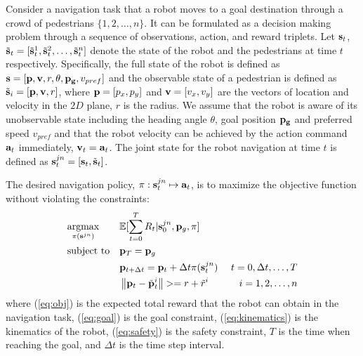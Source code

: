 \documentclass[letterpaper, 10 pt, conference]{ieeeconf}  %
\begin{document}
Consider a navigation task that a robot moves to a goal destination through a crowd of pedestrians $\{1,2,\dots,n\}$. It can be formulated as a decision making problem through a sequence of observations, action, and reward triplets\cite{chen_decentralized_2016,chen_socially_2017,everett_motion_2018}. Let $\bold{s}_t $, $\tilde{\bold{s}}_t = [\tilde{\bold{s}}_t^1, \tilde{\bold{s}}_t^2, \dots, \tilde{\bold{s}}_t^n]$ denote the state of the robot and the pedestrians at time $t$ respectively. Specifically, the full state of the robot is defined as $ \bold{s} = [\bold{p}, \bold{v}, r, \theta, \bold{p_g}, v_{pref}]$ and the observable state of a pedestrian is defined as $ \tilde{\bold{s}}_i = [\bold{p}, \bold{v}, r]$, where $\bold{p}=[p_x,p_y]$ and $\bold{v}=[v_x,v_y]$ are the vectors of location and velocity in the $2D$ plane, $r$ is the radius. We assume that the robot is aware of its unobservable state including the heading angle $\theta$, goal position $\bold{p_g}$ and preferred speed $v_{pref}$ and that the robot velocity can be achieved by the action command $\bold{a}_t$ immediately, $\bold{v}_t = \bold{a}_t$. The joint state for the robot navigation at time $t$ is defined as $\bold{s}_t^{jn} = [\bold{s}_t, \tilde{\bold{s}}_t]$. 

The desired navigation policy, $\pi : \bold{s}_t^{jn} \mapsto \bold{a}_t$, is to maximize the objective function without violating the constraints:
\begin{subequations} \label{eq:optimization}
\begin{align}
& \underset{\pi(\bold{s}^{jn})}{\text{argmax}}
& & \mathbb{E}[\sum_{t=0}^T R_t | \bold{s}_0^{jn}, \bold{p}_g, \pi] \label{eq:obj} \\
& \text{subject to} 
& & \bold{p}_T = \bold{p}_g \label{eq:goal} \\
&&& \bold{p}_{t+\Delta t} = \bold{p}_{t} + \Delta t \pi(\bold{s}_{t}^{jn}) \label{eq:kinematics} ~ & t = 0, \Delta t, \dots, T \\
&&& \left\Vert \bold{p}_t - \tilde{\bold{p}}_t^i \right\Vert >= r + \tilde{r}^i & i = 1, 2, \dots, n \label{eq:safety}
\end{align}
\end{subequations}
where (\ref{eq:obj}) is the expected total reward that the robot can obtain in the navigation task, (\ref{eq:goal}) is the goal constraint, (\ref{eq:kinematics}) is the kinematics of the robot, (\ref{eq:safety}) is the safety constraint, $T$ is the time when reaching the goal, and $\Delta t$ is the time step interval. 
\end{document}
